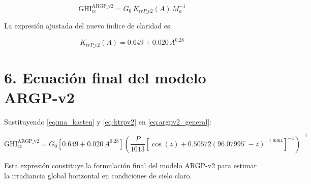 \begin{equation}
\mathrm{GHI_{cc}^{ARGP\_v2}} = 
G_0 \, K_{trP\_v2}(A)\, M_a^{-1}
\label{eq:argpv2_general}
\end{equation}

La expresión ajustada del nuevo índice de claridad es:

\begin{equation}
K_{trP\_v2}(A) = 0.649 + 0.020\, A^{0.28}
\label{eq:ktrpv2}
\end{equation}

\section*{6. Ecuación final del modelo ARGP-v2}

Sustituyendo \eqref{eq:ma_kasten} y \eqref{eq:ktrpv2} en \eqref{eq:argpv2_general}:

\begin{equation}
\boxed{
\mathrm{GHI_{cc}^{ARGP\_v2}} =
G_0 \left[ 0.649 + 0.020\, A^{0.28} \right]
\left(
\frac{P}{1013}
\left[
\cos(z) + 0.50572 \left( 96.07995^\circ - z \right)^{-1.6364}
\right]^{-1}
\right)^{-1}
}
\label{eq:argpv2_final}
\end{equation}

Esta expresión constituye la formulación final del modelo ARGP-v2 para estimar la irradiancia 
global horizontal en condiciones de cielo claro.

